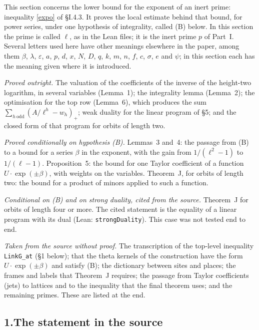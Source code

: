 \documentclass[11pt,letterpaper]{article}
\begin{document}
This section concerns the lower bound for the exponent of an inert prime: inequality \eqref{expo} of
\S I.4.3. It proves the local estimate behind that bound, for power series, under one hypothesis of
integrality, called (B) below. In this section the prime is called $\ell$, as in the Lean files; it is the
inert prime $p$ of Part~I. Several letters used here have other meanings elsewhere in the paper, among them
$\beta$, $\lambda$, $\varepsilon$, $a$, $p$, $d$, $x$, $N$, $D$, $q$, $k$, $m$, $n$, $f$, $c$, $\sigma$, $e$ and $\psi$; in this section each has the meaning
given where it is introduced.

\emph{Proved outright.} The valuation of the coefficients of the inverse of the height-two logarithm, in
several variables (Lemma~1); the integrality lemma (Lemma~2); the optimisation for the top row (Lemma~6),
which produces the sum $\sum_{h\ \mathrm{odd}}(A/\ell^h-w_h)_+$; weak duality for the linear program of \S5;
and the closed form of that program for orbits of length two.

\emph{Proved conditionally on hypothesis \textup{(B)}.} Lemmas~3 and~4: the passage from (B) to a bound for
a series $\beta$ in the exponent, with the gain from $1/(\ell^2-1)$ to $1/(\ell-1)$. Proposition~5: the bound
for one Taylor coefficient of a function $U\cdot\exp(\pm\beta)$, with weights on the variables. Theorem~J,
for orbits of length two: the bound for a product of minors applied to such a function.

\emph{Conditional on \textup{(B)} and on strong duality, cited from the source.} Theorem~J for orbits of
length four or more. The cited statement is the equality of a linear program with its dual (Lean:
\texttt{strongDuality}). This case was not tested end to end.

\emph{Taken from the source without proof.} The transcription of the top-level inequality
\texttt{LinkG\_at} (\S1 below); that the theta kernels of the construction have the form
$U\cdot\exp(\pm\beta)$ and satisfy (B); the dictionary between sites and places; the frames and labels that
Theorem~J requires; the passage from Taylor coefficients (jets) to lattices and to the inequality that the
final theorem uses; and the remaining primes. These are listed at the end.

\subsection*{1.\quad The statement in the source}
\end{document}
